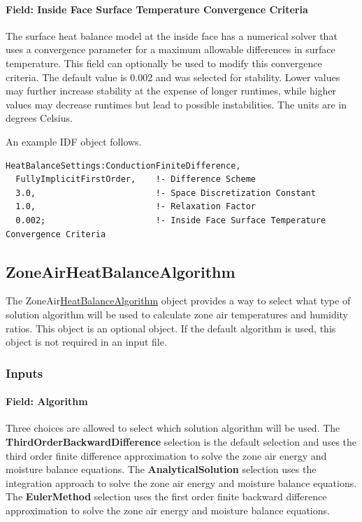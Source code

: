 \paragraph{Field: Inside Face Surface Temperature Convergence Criteria}\label{field-inside-face-surface-temperature-convergence-criteria}

The surface heat balance model at the inside face has a numerical solver that uses a convergence parameter for a maximum allowable differences in surface temperature. This field can optionally be used to modify this convergence criteria. The default value is 0.002 and was selected for stability. Lower values may further increase stability at the expense of longer runtimes, while higher values may decrease runtimes but lead to possible instabilities. The units are in degrees Celsius.

An example IDF object follows.

\begin{lstlisting}
HeatBalanceSettings:ConductionFiniteDifference,
  FullyImplicitFirstOrder,    !- Difference Scheme
  3.0,                        !- Space Discretization Constant
  1.0,                        !- Relaxation Factor
  0.002;                      !- Inside Face Surface Temperature Convergence Criteria
\end{lstlisting}

\subsection{ZoneAirHeatBalanceAlgorithm}\label{zoneairheatbalancealgorithm}

The ZoneAir\hyperref[heatbalancealgorithm]{HeatBalanceAlgorithm} object provides a way to select what type of solution algorithm will be used to calculate zone air temperatures and humidity ratios. This object is an optional object. If the default algorithm is used, this object is not required in an input file.

\subsubsection{Inputs}\label{inputs-8-023}

\paragraph{Field: Algorithm}\label{field-algorithm-3-000}

Three choices are allowed to select which solution algorithm will be used. The \textbf{ThirdOrderBackwardDifference} selection is the default selection and uses the third order finite difference approximation to solve the zone air energy and moisture balance equations. The \textbf{AnalyticalSolution} selection uses the integration approach to solve the zone air energy and moisture balance equations. The \textbf{EulerMethod} selection uses the first order finite backward difference approximation to solve the zone air energy and moisture balance equations.

